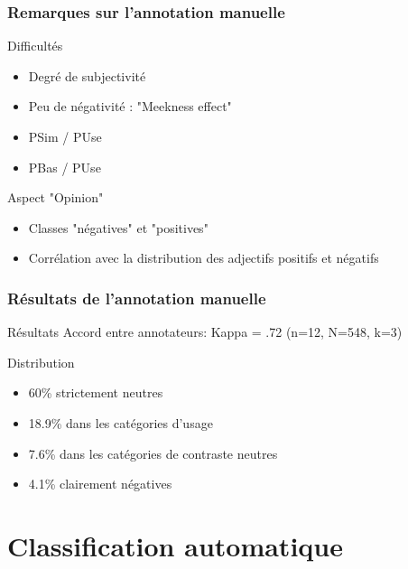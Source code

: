 \documentclass[10pt]{beamer}
\begin{document}
\begin{frame}
  \frametitle{Remarques sur l'annotation manuelle}  
  \begin{block}{Difficultés}
	  \begin{itemize}
		\item Degré de subjectivité
		\item Peu de négativité : "Meekness effect"
		\item PSim / PUse
		\item PBas / PUse
	  \end{itemize}
  \end{block}
  
  \begin{block}{Aspect "Opinion"}
	  \begin{itemize}
		\item Classes "négatives" et "positives"
		\item Corrélation avec la distribution des adjectifs positifs et négatifs
	  \end{itemize}
  \end{block}
\end{frame}

\begin{frame}
  \frametitle{Résultats de l'annotation manuelle}
  
  \begin{block}{Résultats}
  	Accord entre annotateurs: Kappa = .72
  	(n=12, N=548, k=3)
  \end{block}
  
  \begin{block}{Distribution}
	  \begin{itemize}
		\item 60\% strictement neutres
		\item 18.9\% dans les catégories d'usage
		\item 7.6\% dans les catégories de contraste neutres
		\item 4.1\% clairement négatives
	  \end{itemize}
  \end{block}
\end{frame}

\section{Classification automatique}
\label{sec:machinelearning}
\end{document}
